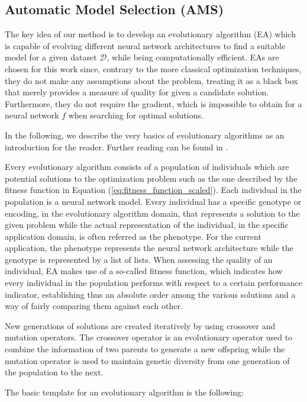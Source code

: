 \documentclass[12pt]{elsart}%
\begin{document}
\subsection{Automatic Model Selection (AMS)}

The key idea of our method is to develop an evolutionary algorithm (EA) which is capable of evolving different neural network architectures to find a suitable model for a given dataset $\mathcal{D}$, while being computationally efficient. EAs are chosen for this work since, contrary to the more classical optimization techniques, they do not make any assumptions about the problem, treating it as a black box that merely provides a measure of quality for given a candidate solution. Furthermore, they do not require the gradient, which is impossible to obtain for a neural network $f$ when searching for optimal solutions.

In the following, we describe the very basics of evolutionary algorithms as an introduction for the reader. Further reading can be found in \cite{Engelbrecht,Ebehart2007,Sumathi2010}. 

Every evolutionary algorithm consists of a population of individuals which are potential solutions to the optimization problem such as the one described by the fitness function in Equation (\ref{eq:fitness_function_scaled}). Each individual in the population is a neural network model. Every individual has a specific genotype or encoding, in the evolutionary algorithm domain, that represents a solution to the given problem while the actual representation of the individual, in the specific application domain, is often referred as the phenotype. For the current application, the phenotype represents the neural network architecture while the genotype is represented by a list of lists. When assessing the quality of an individual, EA makes use of a so-called fitness function, which indicates how every individual in the population performs with respect to a certain performance indicator, establishing thus an absolute order among the various solutions and a way of fairly comparing them against each other. 

New generations of solutions are created iteratively by using crossover and mutation operators. The crossover operator is an evolutionary operator used to combine the information of two parents to generate a new offspring while the mutation operator is used to maintain genetic diversity from one generation of the population to the next.

The basic template for an evolutionary algorithm is the following:
\end{document}
